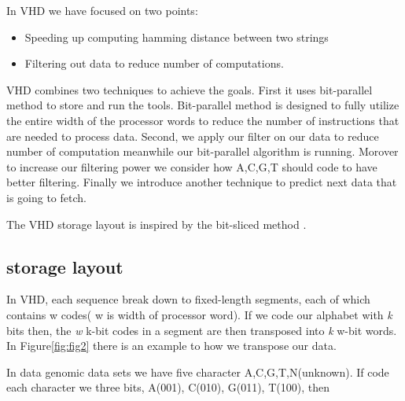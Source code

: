 In VHD we have focused on two points:
\begin{itemize}
\item Speeding up computing hamming distance between two strings
\item Filtering out data to reduce number of computations.
\end{itemize}
  
 VHD combines two techniques to achieve the goals. First it uses bit-parallel method to store and run the tools. Bit-parallel method is designed to fully utilize the entire width of the processor words to reduce the number of instructions that are needed to process data. Second, we apply  our filter on our data to reduce number of computation meanwhile our bit-parallel algorithm is running. Morover to increase our filtering power we consider how A,C,G,T should code to have better filtering. Finally we introduce another technique to predict next data that is going to fetch.
 
 The VHD storage layout is inspired by the bit-sliced method \cite{O_Neil_1997}. 
 \subsection{storage layout}
 In VHD, each sequence break down to fixed-length segments, each of which contains w codes( w is width of processor word). If we code our alphabet with \emph{k} bits then, the \emph{w} k-bit codes in a segment are then transposed into \emph{k} w-bit words. In Figure\ref{fig:fig2} there is an example to how we transpose our data.
 
 In data genomic data sets we have five character A,C,G,T,N(unknown). If code each character we three bits, A(001), C(010), G(011), T(100), then 
 
  
  
  
  